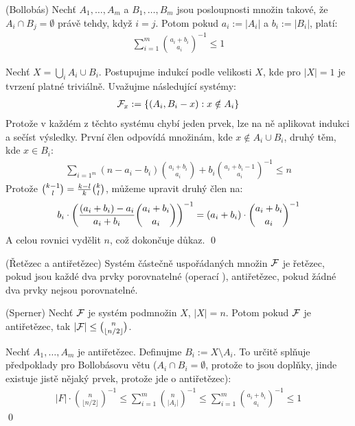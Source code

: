 \vt (Bollobás) Nechť $A_1, \dots, A_m$ a $B_1, \dots, B_m$ jsou posloupnosti
množin takové, že $A_i \cap B_j = \emptyset$ právě tehdy, když $i = j$. Potom
pokud $a_i := |A_i|$ a $b_i := |B_i|$, platí:
\begin{align}
	\sum_{i=1}^m\binom{a_i + b_i}{a_i}^{-1} \leq 1
\end{align}

\dk Nechť $X = \bigcup_i A_i \cup B_i$. Postupujme indukcí podle velikosti $X$,
kde pro $|X| = 1$ je tvrzení platné triviálně. Uvažujme následující systémy:
\begin{align}
	\mathcal{F}_x := \{ (A_i, B_i - x) : x \notin A_i\}
\end{align}
Protože v každém z těchto systému chybí jeden prvek, lze na ně aplikovat indukci
a sečíst výsledky. První člen odpovídá množinám, kde $x\notin A_i \cup B_i$,
druhý těm, kde $x \in B_i$:
\begin{align}
	\sum_{i=1^m}(n-a_i-b_i) \binom{a_i+b_i}{a_i} + b_i\binom{a_i+b_i-1}{a_i}^{-1} \leq
	n
\end{align}
Protože $\binom{k-1}{l} = {k-l\over k}\binom{k}{l}$, můžeme upravit druhý člen
na:
\begin{align}
	b_i \cdot \left({(a_i+b_i)-a_i \over a_i+b_i}
	\binom{a_i+b_i}{a_i}\right)^{-1} = (a_i + b_i) \cdot
	\binom{a_i+b_i}{a_i}^{-1}
\end{align}
A celou rovnici vydělit $n$, což dokončuje důkaz. \qed

\df (Řetězec a antiřetězec) Systém částečně uspořádaných množin $\mathcal{F}$ je řetězec,
pokud jsou každé dva prvky porovnatelné (operací ), antiřetězec,
pokud žádné dva prvky nejsou porovnatelné.

\vt (Sperner) Nechť $\mathcal{F}$ je systém podmnožin $X$, $|X| = n$. Potom pokud $\mathcal{F}$ je
antiřetězec, tak $|\mathcal{F}| \leq \binom{n}{\lfloor n/2 \rfloor}$.

\dk Nechť $A_1, \dots, A_m$ je antiřetězec. Definujme $B_i := X \setminus A_i$.
To určitě splňuje předpoklady pro Bollobásovu větu ($A_i \cap B_i = \emptyset$,
protože to jsou doplňky, jinde existuje jistě nějaký prvek, protože jde o
antiřetězec):
\begin{align}
	|F| \cdot \binom{n}{\lfloor n/2 \rfloor}^{-1} \leq
	\sum_{i=1}^m\binom{n}{|A_i|}^{-1} \leq \sum_{i=1}^m \binom{a_i +
	b_i}{a_i}^{-1} \leq 1
\end{align}
\qed
